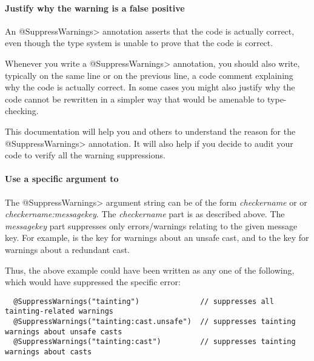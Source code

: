 
\paragraph{Justify why the warning is a false positive}

An \<@SuppressWarnings> annotation asserts that the code is actually
correct, even though the type system is unable to prove that the code is
correct.

Whenever you write a \<@SuppressWarnings> annotation, you should also
write, typically on the same line or on the previous line, a code comment
explaining why the code is actually correct.  In some cases you might also
justify why the code cannot be rewritten in a simpler way that would be
amenable to type-checking.

This documentation will help you and others to understand the reason for
the \<@SuppressWarnings> annotation.  It will also help if you decide to
audit your code to verify all the warning suppressions.

\paragraph{Use a specific argument to }

\label{compiler-message-keys}

The \<@SuppressWarnings> argument string can be of the form
\emph{checkername} or
or \emph{checkername:messagekey}.  The \emph{checkername} part is as
described above.  The \emph{messagekey} part suppresses only
errors/warnings relating to the given message key.  For example,
 is the key for warnings about an unsafe cast, and
 to the key for warnings about a redundant cast.

Thus, the above example could have been written as any one of the
following, which would have suppressed the specific error:

\begin{Verbatim}
  @SuppressWarnings("tainting")              // suppresses all tainting-related warnings
  @SuppressWarnings("tainting:cast.unsafe")  // suppresses tainting warnings about unsafe casts
  @SuppressWarnings("tainting:cast")         // suppresses tainting warnings about casts
\end{Verbatim}

